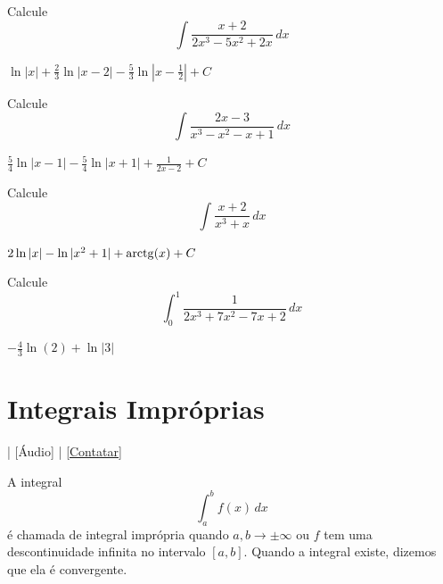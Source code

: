 \begin{exer}
  Calcule
  \begin{equation}
    \int\frac{x+2}{2x^3-5x^2+2x}\,dx
  \end{equation}
\end{exer}
\begin{resp}
  $\ln|x|+\frac{2}{3}\ln|x-2|-\frac{5}{3}\ln|x-\frac{1}{2}| + C$
\end{resp}

\begin{exer}
  Calcule
  \begin{equation}
    \int\frac{2x-3}{x^3-x^2-x+1}\,dx
  \end{equation}
\end{exer}
\begin{resp}
  $\frac{5}{4}\ln|x-1|-\frac{5}{4}\ln|x+1|+\frac{1}{2x-2} + C$
\end{resp}

\begin{exer}
  Calcule
  \begin{equation}
    \int\frac{x+2}{x^3+x}\,dx
  \end{equation}
\end{exer}
\begin{resp}
  $2\ln|x| - \ln|x^2+1| + \operatorname{arctg}(x) + C$
\end{resp}

\begin{exer}
  Calcule
  \begin{equation}
    \int_0^1\frac{1}{2x^3+7x^2-7x+2}\,dx
  \end{equation}
\end{exer}
\begin{resp}
  $-\frac{4}{3}\ln(2)+\ln|3|$
\end{resp}

\section{Integrais Impróprias}\label{cap_int_sec_intimp}

\begin{flushright}
  [Vídeo] | [Áudio] | \href{https://phkonzen.github.io/notas/contato.html}{[Contatar]}
\end{flushright}

A integral
\begin{equation}
  \int_a^b f(x)\,dx
\end{equation}
é chamada de integral imprópria quando $a,b\to\pm\infty$ ou $f$ tem uma descontinuidade infinita no intervalo $[a, b]$. Quando a integral existe, dizemos que ela é convergente.

